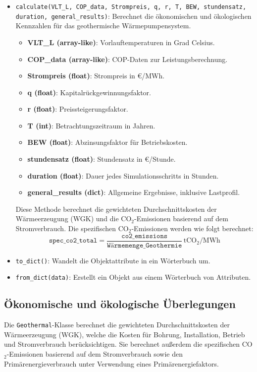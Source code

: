 \begin{itemize}
    \item \texttt{calculate(VLT\_L, COP\_data, Strompreis, q, r, T, BEW, stundensatz, duration, general\_results)}: Berechnet die ökonomischen und ökologischen Kennzahlen für das geothermische Wärmepumpensystem.
    \begin{itemize}
        \item \textbf{VLT\_L (array-like)}: Vorlauftemperaturen in Grad Celsius.
        \item \textbf{COP\_data (array-like)}: COP-Daten zur Leistungsberechnung.
        \item \textbf{Strompreis (float)}: Strompreis in €/MWh.
        \item \textbf{q (float)}: Kapitalrückgewinnungsfaktor.
        \item \textbf{r (float)}: Preissteigerungsfaktor.
        \item \textbf{T (int)}: Betrachtungszeitraum in Jahren.
        \item \textbf{BEW (float)}: Abzinsungsfaktor für Betriebskosten.
        \item \textbf{stundensatz (float)}: Stundensatz in €/Stunde.
        \item \textbf{duration (float)}: Dauer jedes Simulationsschritts in Stunden.
        \item \textbf{general\_results (dict)}: Allgemeine Ergebnisse, inklusive Lastprofil.
    \end{itemize}
    Diese Methode berechnet die gewichteten Durchschnittskosten der Wärmeerzeugung (WGK) und die CO$_2$-Emissionen basierend auf dem Stromverbrauch. Die spezifischen CO$_2$-Emissionen werden wie folgt berechnet:
    \[
    \texttt{spec\_co2\_total} = \frac{\texttt{co2\_emissions}}{\texttt{Wärmemenge\_Geothermie}} \, \text{tCO$_2$/MWh}
    \]

    \item \texttt{to\_dict()}: Wandelt die Objektattribute in ein Wörterbuch um.
    
    \item \texttt{from\_dict(data)}: Erstellt ein Objekt aus einem Wörterbuch von Attributen.
\end{itemize}

\subsection{Ökonomische und ökologische Überlegungen}
Die \texttt{Geothermal}-Klasse berechnet die gewichteten Durchschnittskosten der Wärmeerzeugung (WGK), welche die Kosten für Bohrung, Installation, Betrieb und Stromverbrauch berücksichtigen. Sie berechnet außerdem die spezifischen CO$_2$-Emissionen basierend auf dem Stromverbrauch sowie den Primärenergieverbrauch unter Verwendung eines Primärenergiefaktors.

